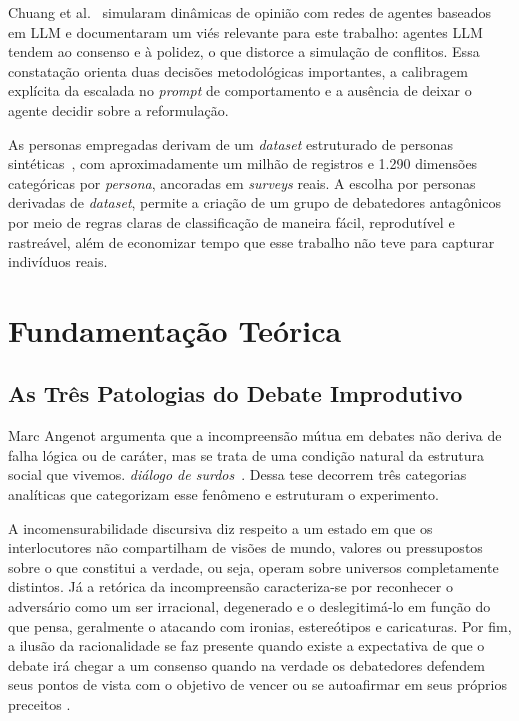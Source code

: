 \documentclass[conference]{IEEEtran} \IEEEoverridecommandlockouts %
\begin{document}
Chuang et al.~\cite{chuang2023simulating} simularam dinâmicas de opinião com
redes de agentes baseados em LLM e documentaram um viés relevante para este
trabalho: agentes LLM tendem ao consenso e à polidez, o que distorce a
simulação de conflitos. Essa constatação orienta duas decisões metodológicas
importantes, a calibragem explícita da escalada no \textit{prompt} de comportamento e
a ausência de deixar o agente decidir sobre a reformulação.

As personas empregadas derivam de um \textit{dataset} estruturado de personas
sintéticas~\cite{li2026matraix}, com aproximadamente um milhão de registros e
1.290 dimensões categóricas por \textit{persona}, ancoradas em \textit{surveys} reais. A escolha
por personas derivadas de \textit{dataset}, permite a criação de um grupo de debatedores antagônicos por meio de regras claras de classificação de maneira fácil, reprodutível e rastreável, além de economizar tempo que esse trabalho não teve para capturar indivíduos reais.

\section{Fundamentação Teórica}

\subsection{As Três Patologias do Debate Improdutivo}

Marc Angenot argumenta que a incompreensão mútua em debates não deriva de
falha lógica ou de caráter, mas se trata de uma condição natural da estrutura social que vivemos.
\textit{diálogo de surdos}~\cite{angenot2008dialogues}. Dessa tese decorrem três
categorias analíticas que categorizam esse fenômeno e estruturam o experimento.

A incomensurabilidade discursiva diz respeito a um estado em que os interlocutores não compartilham de visões de mundo, valores ou pressupostos sobre o que constitui a verdade, ou seja, operam sobre universos completamente distintos. Já a retórica da incompreensão caracteriza-se por reconhecer o adversário como um ser irracional, degenerado e o deslegitimá-lo em função do que pensa, geralmente o atacando com ironias, estereótipos e caricaturas. Por fim, a ilusão da racionalidade se faz presente quando existe a expectativa de que o debate irá chegar a um consenso quando na verdade os debatedores defendem seus pontos de vista com o objetivo de vencer ou se autoafirmar em seus próprios preceitos \cite{angenot2008dialogues} \cite{angenot2010discurso}. 
\end{document}
